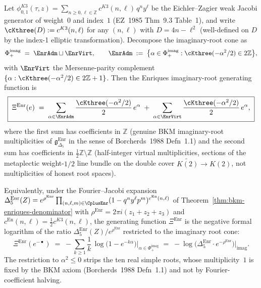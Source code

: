 \begin{theorem}
\label{thm:bkm-enriques-generating-function}
Let $\phi^{K3}_{0,1}(\tau, z) = \sum_{n\geq 0, \ell\in\mathbb{Z}}
c^{K3}(n, \ell)\,q^n y^\ell$ be the Eichler--Zagier weak Jacobi
generator of weight~$0$ and index~$1$ (EZ~1985 Thm~9.3
Table~1), and write $\cKthree(D) := c^{K3}(n, \ell)$ for any
$(n, \ell)$ with $D = 4n - \ell^2$ (well-defined on $D$ by the
index-1 elliptic transformation). Decompose the
imaginary-root cone as
\[
 \Phi_+^{\mathrm{imag}}
 \;=\;
 \EnrAdm \sqcup \EnrVirt,
 \qquad
 \EnrAdm \;:=\; \bigl\{\alpha\in\Phi_+^{\mathrm{imag}}
 : \cKthree(-\alpha^2/2)\in 2\mathbb{Z}\bigr\},
\]
with $\EnrVirt$ the Mersenne-parity complement
$\{\alpha : \cKthree(-\alpha^2/2)\in 2\mathbb{Z}+1\}$. Then the
Enriques imaginary-root generating function is
\begin{equation}
\label{eq:bkm-enriques-gen-fun-master}
 \boxed{\;
 \Xi^{\mathrm{Enr}}(e)
 \;=\;
 \sum_{\alpha\in\EnrAdm}\frac{\cKthree(-\alpha^2/2)}{2}\,e^\alpha
 \;+\;
 \sum_{\alpha\in\EnrVirt}\frac{\cKthree(-\alpha^2/2)}{2}\,e^\alpha,
 \;}
\end{equation}
where the first sum has coefficients in $\mathbb{Z}$ (genuine BKM
imaginary-root multiplicities of
$\mathfrak{g}_{\Delta_5}^{\mathrm{Enr}}$ in the sense of
Borcherds~1988 Defn~1.1) and the second sum has coefficients in
$\tfrac{1}{2}\mathbb{Z}\setminus\mathbb{Z}$ (half-integer virtual
multiplicities, sections of the metaplectic weight-$1/2$ line
bundle on the double cover $\widetilde{K(2)}\to K(2)$, not
multiplicities of honest root spaces).

Equivalently, under the Fourier--Jacobi expansion
$\Delta_5^{\mathrm{Enr}}(Z) = e^{\rho^{\mathrm{Enr}}}
\prod_{(n,\ell,m)\in\CplusEnr}(1 - q^n y^\ell p^m)^{c^{\mathrm{En}}(n,\ell)}$
of Theorem~\ref{thm:bkm-enriques-denominator} with
$\rho^{\mathrm{Enr}} = 2\pi i(z_1 + z_2 + z_3)$ and
$c^{\mathrm{En}}(n,\ell) = \tfrac{1}{2}c^{K3}(n,\ell)$, the generating
function $\Xi^{\mathrm{Enr}}$ is the negative formal logarithm of the
ratio $\Delta_5^{\mathrm{Enr}}(Z) / e^{\rho^{\mathrm{Enr}}}$
restricted to the imaginary root cone:
\begin{equation}
\label{eq:bkm-enriques-gen-fun-log}
 \Xi^{\mathrm{Enr}}(e^{-\bullet})
 \;=\;
 -\sum_{k\geq 1}\frac{1}{k}\,\log\!\bigl(1 - e^{-k\alpha}\bigr)
 \bigr|_{\alpha\in\Phi_+^{\mathrm{imag}}}
 \;=\;
 -\log\!\bigl(\Delta_5^{\mathrm{Enr}}\cdot e^{-\rho^{\mathrm{Enr}}}\bigr)
 \bigr|_{\mathrm{imag}}.
\end{equation}
The restriction to $\alpha^2 \leq 0$ strips the ten real simple roots,
whose multiplicity~$1$ is fixed by the BKM axiom
(Borcherds~1988 Defn~1.1) and not by Fourier-coefficient halving.


\end{theorem}
